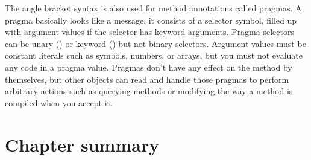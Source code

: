 \documentclass[a4paper,10pt,twoside]{book}
\begin{document}



The angle bracket syntax is also used for method annotations called pragmas.
A pragma basically looks like a message, it consists of a selector symbol, filled up with argument values if the selector has keyword arguments.
Pragma selectors can be unary () or keyword () but not binary selectors.
Argument values must be constant literals such as symbols, numbers, or arrays, but you must not evaluate any code in a pragma value.
Pragmas don't have any effect on the method by themselves, but other objects can read and handle those pragmas to perform arbitrary actions such as querying methods or modifying the way a method is compiled when you accept it.

\section{Chapter summary}
\end{document}
